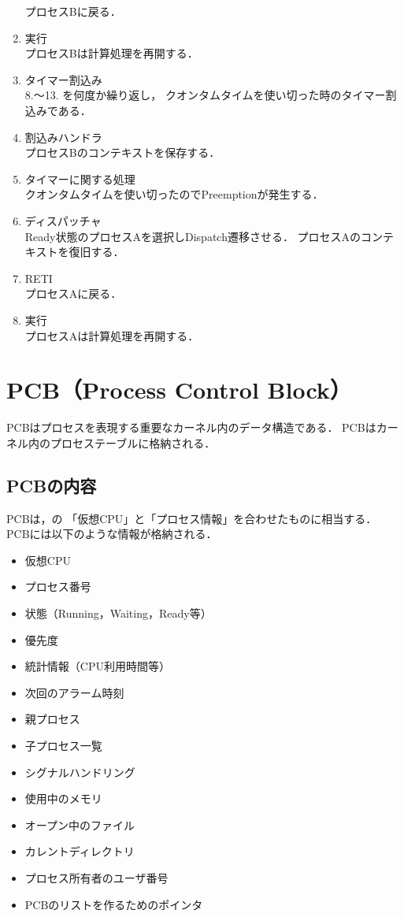 \begin{enumerate}
  プロセスBに戻る．
\item 実行 \\
  プロセスBは計算処理を再開する．
\item タイマー割込み \\
  8.〜13. を何度か繰り返し，
  クオンタムタイムを使い切った時のタイマー割込みである．
\item 割込みハンドラ \\
  プロセスBのコンテキストを保存する．
\item タイマーに関する処理 \\
  クオンタムタイムを使い切ったのでPreemptionが発生する．
\item ディスパッチャ \\
  Ready状態のプロセスAを選択しDispatch遷移させる．
  プロセスAのコンテキストを復旧する．
\item RETI \\
  プロセスAに戻る．
\item 実行 \\
  プロセスAは計算処理を再開する．
\end{enumerate}

\section{PCB（Process Control Block）}
PCBはプロセスを表現する重要なカーネル内のデータ構造である．
PCBはカーネル内のプロセステーブルに格納される．

\subsection{PCBの内容}
PCBは，の
「仮想CPU」と「プロセス情報」を合わせたものに相当する．
PCBには以下のような情報が格納される．

\begin{itemize}
\item 仮想CPU
\item プロセス番号
\item 状態（Running，Waiting，Ready等）
\item 優先度
\item 統計情報（CPU利用時間等）
\item 次回のアラーム時刻
\item 親プロセス
\item 子プロセス一覧
\item シグナルハンドリング
\item 使用中のメモリ
\item オープン中のファイル
\item カレントディレクトリ
\item プロセス所有者のユーザ番号
\item PCBのリストを作るためのポインタ
\end{itemize}

